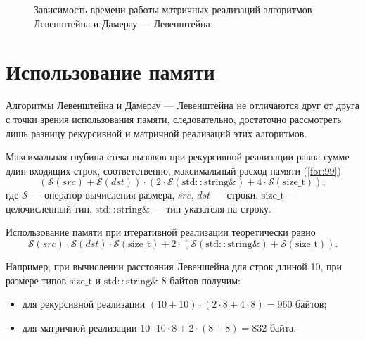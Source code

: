 \begin{figure}
	\centering
	\captionsetup{justification=centering}
	\caption{Зависимость времени работы матричных реализаций алгоритмов Левенштейна и Дамерау — Левенштейна}
	\label{plt:performance-matrix}
\end{figure}

\section{Использование памяти}

Алгоритмы Левенштейна и Дамерау — Левенштейна не отличаются друг от друга с точки зрения использования памяти, следовательно, достаточно рассмотреть лишь разницу рекурсивной и матричной реализаций этих алгоритмов.

Максимальная глубина стека вызовов при рекурсивной реализации равна сумме длин входящих строк, соответственно, максимальный расход памяти (\ref{for:99})
\begin{equation}
(\mathcal{S}(src) + \mathcal{S}(dst)) \cdot (2 \cdot \mathcal{S}\mathrm{(std\!::\!string\&)} + 4 \cdot \mathcal{S}\mathrm{(size\_t)}),
\label{for:99}
\end{equation}
где $\mathcal{S}$ — оператор вычисления размера, $src$, $dst$ — строки, $\mathrm{size\_t}$ — целочисленный тип, $\mathrm{std\!::\!string\&}$ — тип указателя на строку.

Использование памяти при итеративной реализации теоретически равно
\begin{equation}
\mathcal{S}(src) \cdot \mathcal{S}(dst) \cdot \mathcal{S}\mathrm{(size\_t)} + 2\cdot(\mathcal{S}\mathrm{(std\!::\!string\&)} + \mathcal{S}\mathrm{(size\_t)}).
\end{equation}

Например, при вычислении расстояния Левеншейна для строк длиной 10, при размере типов $\mathrm{size\_t}$ и $\mathrm{std\!::\!string\&}$ 8 байтов получим:
\begin{itemize}
	\item для рекурсивной реализации $(10 + 10) \cdot (2\cdot8 + 4\cdot8) = 960$ байтов;
	\item для матричной реализации $10 \cdot 10 \cdot 8 + 2\cdot(8 + 8) = 832$ байта.
\end{itemize}

